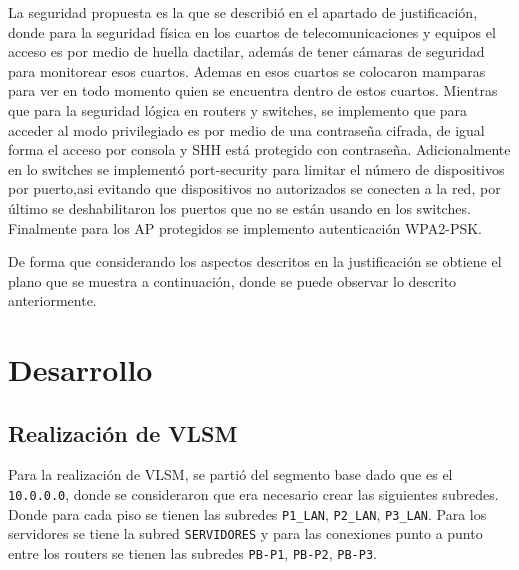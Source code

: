 \documentclass[letterpaper,11pt]{article}
\begin{document}
    La seguridad propuesta es la que se describió en el apartado de justificación, donde para la seguridad física en los cuartos de telecomunicaciones y equipos el acceso es por medio de huella dactilar, además de tener cámaras de seguridad para monitorear esos cuartos. Ademas en esos cuartos se colocaron mamparas para ver en todo momento quien se encuentra dentro de estos cuartos. Mientras que para la seguridad lógica en routers y switches, se implemento que para acceder al modo privilegiado es por medio de una contraseña cifrada, de igual forma el acceso por consola y SHH está protegido con contraseña. Adicionalmente en lo switches se implementó port-security para limitar el número de dispositivos por puerto,asi evitando que dispositivos no autorizados se conecten a la red, por último se deshabilitaron los puertos que no se están usando en los switches. Finalmente para los AP protegidos se implemento autenticación WPA2-PSK.

    De forma que considerando los aspectos descritos en la justificación se obtiene el plano que se muestra a continuación, donde se puede observar lo descrito anteriormente.


    

    \section{Desarrollo}

    \subsection{Realización de VLSM}

    Para la realización de VLSM, se partió del segmento base dado que es el \texttt{10.0.0.0}, donde se consideraron que era necesario crear las siguientes subredes. Donde para cada piso se tienen las subredes \texttt{P1\_LAN}, \texttt{P2\_LAN}, \texttt{P3\_LAN}. Para los servidores se tiene la subred \texttt{SERVIDORES} y para las conexiones punto a punto entre los routers se tienen las subredes \texttt{PB-P1}, \texttt{PB-P2}, \texttt{PB-P3}. 
\end{document}
